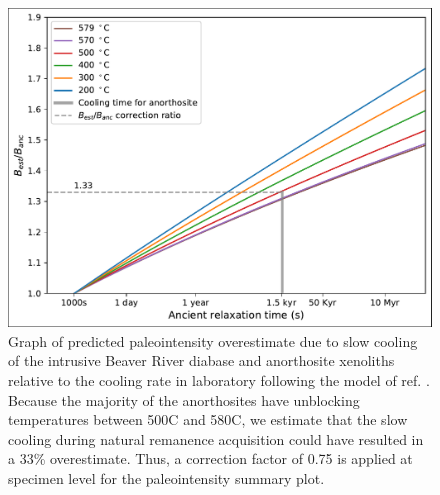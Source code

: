 \documentclass[9pt,twoside]{pnas-new}
\begin{document}
\begin{figure}[h!]
\noindent\includegraphics[width=17.8 cm]{Cooling_rate_correction.pdf}
\centering
\caption{{Graph of predicted paleointensity overestimate due to slow cooling of the intrusive Beaver River diabase and anorthosite xenoliths relative to the cooling rate in laboratory following the model of ref. \citealp{Halgedahl1980a}. Because the majority of the anorthosites have unblocking temperatures between 500\textdegree C and 580\textdegree C, we estimate that the slow cooling during natural remanence acquisition could have resulted in a 33\% overestimate. Thus, a correction factor of 0.75 is applied at specimen level for the paleointensity summary plot.}}
\label{fig:PINT_cooling_corrected}
\end{figure}

\clearpage
\end{document}
